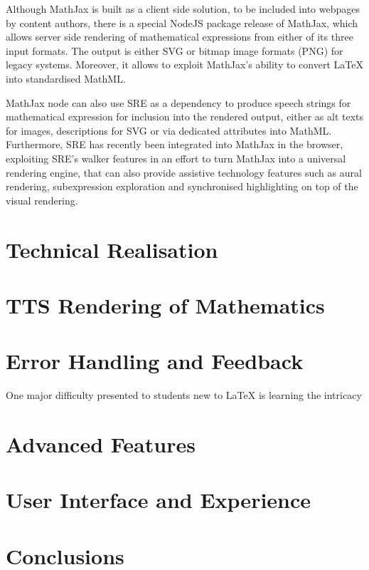 \documentclass{sig-alternate}
\newcommand{\latex}{\LaTeX\xspace}
\newcommand{\sre}{SRE\xspace}
\def\latex{\LaTeX}
\begin{document}
Although MathJax is built as a client side solution, to be included into
webpages by content authors, there is a special NodeJS package release of
MathJax, which allows server side rendering of mathematical expressions from
either of its three input formats. The output is either SVG or bitmap image
formats (PNG) for legacy systems. Moreover, it allows to exploit MathJax's
ability to convert {\latex} into standardised MathML. 

MathJax node can also use \sre as a dependency to produce speech strings for
mathematical expression for inclusion into the rendered output, either as alt
texts for images, descriptions for SVG or via dedicated attributes into MathML.
Furthermore, \sre has recently been integrated into MathJax in the browser,
exploiting SRE's walker features in an effort to turn MathJax into a universal
rendering engine, that can also provide assistive technology features such as
aural rendering, subexpression exploration and synchronised
highlighting\cite{w4a} on top of the visual rendering.

\section{Technical Realisation}
\label{sec:technical-realisation}

\section{TTS Rendering of Mathematics}
\label{sec:rendering}


\section{Error Handling and Feedback}
\label{sec:error-handling}

One major difficulty presented to students new to {\LaTeX} is learning the intricacy

\section{Advanced Features}
\label{sec:error-handling}

\section{User Interface and Experience}
\label{sec:ui}

\section{Conclusions}
\label{sec:conc}



\end{document}
